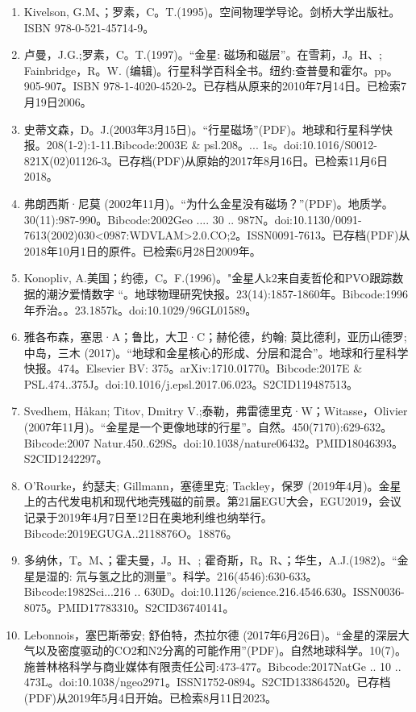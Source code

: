 \begin{enumerate}
\item Kivelson, G.M、；罗素，C。T.(1995)。空间物理学导论。剑桥大学出版社。ISBN 978-0-521-45714-9。
\item 卢曼，J.G.;罗素，C。T.(1997)。“金星: 磁场和磁层”。在雪莉，J。H、; Fainbridge，R。W. (编辑)。行星科学百科全书。纽约:查普曼和霍尔。pp。 905-907。ISBN 978-1-4020-4520-2。已存档从原来的2010年7月14日。已检索7月19日2006。
\item 史蒂文森，D。J.(2003年3月15日)。“行星磁场”(PDF)。地球和行星科学快报。208(1-2):1-11.Bibcode:2003E & psl.208。... 1s。doi:10.1016/S0012-821X(02)01126-3。已存档(PDF)从原始的2017年8月16日。已检索11月6日2018。
\item 弗朗西斯·尼莫 (2002年11月)。“为什么金星没有磁场？”(PDF)。地质学。30(11):987-990。Bibcode:2002Geo .... 30 .. 987N。doi:10.1130/0091-7613(2002)030<0987:WDVLAM>2.0.CO;2。ISSN0091-7613。已存档(PDF)从2018年10月1日的原件。已检索6月28日2009年。  
\item Konopliv, A.美国；约德，C。F.(1996)。"金星人k2来自麦哲伦和PVO跟踪数据的潮汐爱情数字 “。地球物理研究快报。23(14):1857-1860年。Bibcode:1996年乔治。。23.1857k。doi:10.1029/96GL01589。
\item 雅各布森，塞思·A；鲁比，大卫·C；赫伦德，约翰; 莫比德利，亚历山德罗; 中岛，三木 (2017)。“地球和金星核心的形成、分层和混合”。地球和行星科学快报。474。Elsevier BV: 375。arXiv:1710.01770。Bibcode:2017E & PSL.474..375J。doi:10.1016/j.epsl.2017.06.023。S2CID119487513。 
\item Svedhem, Håkan; Titov, Dmitry V.;泰勒，弗雷德里克·W；Witasse，Olivier (2007年11月)。“金星是一个更像地球的行星”。自然。450(7170):629-632。Bibcode:2007 Natur.450..629S。doi:10.1038/nature06432。PMID18046393。S2CID1242297。  
\item O'Rourke，约瑟夫; Gillmann，塞德里克; Tackley，保罗 (2019年4月)。金星上的古代发电机和现代地壳残磁的前景。第21届EGU大会，EGU2019，会议记录于2019年4月7日至12日在奥地利维也纳举行。Bibcode:2019EGUGA..2118876O。18876。
\item 多纳休，T。M、；霍夫曼，J。H、; 霍奇斯，R。R、；华生，A.J.(1982)。“金星是湿的: 氘与氢之比的测量”。科学。216(4546):630-633。Bibcode:1982Sci...216 .. 630D。doi:10.1126/science.216.4546.630。ISSN0036-8075。PMID17783310。S2CID36740141。   
\item Lebonnois，塞巴斯蒂安; 舒伯特，杰拉尔德 (2017年6月26日)。“金星的深层大气以及密度驱动的CO2和N2分离的可能作用”(PDF)。自然地球科学。10(7)。施普林格科学与商业媒体有限责任公司:473-477。Bibcode:2017NatGe .. 10 .. 473L。doi:10.1038/ngeo2971。ISSN1752-0894。S2CID133864520。已存档(PDF)从2019年5月4日开始。已检索8月11日2023。   

\end{enumerate}
